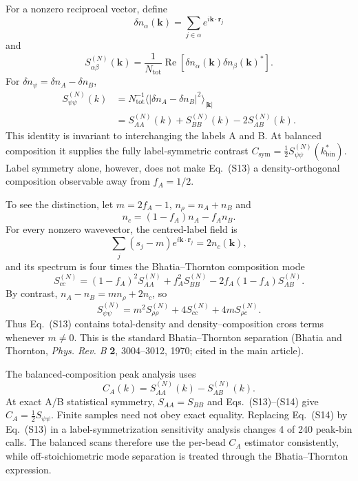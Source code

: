 \documentclass[pdflatex,sn-nature,onecolumn]{sn-jnl}
\begin{document}
For a nonzero reciprocal vector, define
\begin{equation}
\delta n_\alpha(\bm{k})=\sum_{j\in\alpha}e^{i\bm{k}\cdot\bm{r}_j}
\tag{S11}
\end{equation}
and
\begin{equation}
S_{\alpha\beta}^{(N)}(\bm{k})=
\frac{1}{N_{\mathrm{tot}}}\operatorname{Re}
\left[\delta n_\alpha(\bm{k})\delta n_\beta(\bm{k})^*\right].
\tag{S12}
\end{equation}
For $\delta n_\psi=\delta n_A-\delta n_B$,
\begin{align}
S_{\psi\psi}^{(N)}(k)
&=N_{\mathrm{tot}}^{-1}\langle|\delta n_A-\delta n_B|^2\rangle_{|\bm{k}|}\nonumber\\
&=S_{AA}^{(N)}(k)+S_{BB}^{(N)}(k)-2S_{AB}^{(N)}(k).
\tag{S13}
\end{align}
This identity is invariant to interchanging the labels A and B. At balanced composition it supplies the fully label-symmetric contrast $C_{\mathrm{sym}}=\tfrac12S_{\psi\psi}^{(N)}(k_{\mathrm{bin}}^*)$. Label symmetry alone, however, does not make Eq.~(S13) a density-orthogonal composition observable away from $f_A=1/2$.

To see the distinction, let $m=2f_A-1$, $n_\rho=n_A+n_B$ and
\[
n_c=(1-f_A)n_A-f_A n_B.
\]
For every nonzero wavevector, the centred-label field is
\[
\sum_j(s_j-m)e^{i\bm{k}\cdot\bm r_j}=2n_c(\bm k),
\]
and its spectrum is four times the Bhatia--Thornton composition mode
\[
S_{cc}^{(N)}=(1-f_A)^2S_{AA}^{(N)}+f_A^2S_{BB}^{(N)}
-2f_A(1-f_A)S_{AB}^{(N)}.
\]
By contrast, $n_A-n_B=m n_\rho+2n_c$, so
\[
S_{\psi\psi}^{(N)}=m^2S_{\rho\rho}^{(N)}+4S_{cc}^{(N)}
+4mS_{\rho c}^{(N)}.
\]
Thus Eq.~(S13) contains total-density and density--composition cross terms whenever $m\ne0$. This is the standard Bhatia--Thornton separation (Bhatia and Thornton, \emph{Phys. Rev. B} \textbf{2}, 3004--3012, 1970; cited in the main article).

The balanced-composition peak analysis uses
\begin{equation}
C_A(k)=S_{AA}^{(N)}(k)-S_{AB}^{(N)}(k).
\tag{S14}
\end{equation}
At exact A/B statistical symmetry, $S_{AA}=S_{BB}$ and Eqs.~(S13)--(S14) give $C_A=\tfrac12S_{\psi\psi}$. Finite samples need not obey exact equality. Replacing Eq.~(S14) by Eq.~(S13) in a label-symmetrization sensitivity analysis changes 4 of 240 peak-bin calls. The balanced scans therefore use the per-bead $C_A$ estimator consistently, while off-stoichiometric mode separation is treated through the Bhatia--Thornton expression.
\end{document}

